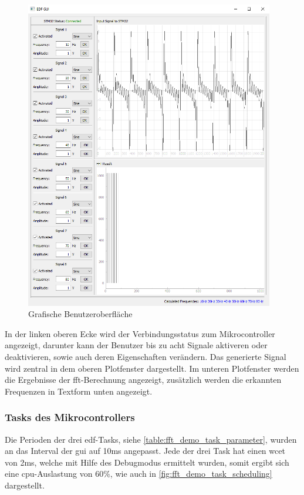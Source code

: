 \documentclass[../EDF Master Thesis.tex]{subfiles}
\begin{document}
            \begin{figure}[H]
                \centering
                \includegraphics[width=0.97\textwidth]{./attachments/gui.png}
                \caption{Grafische Benutzeroberfläche}
                \label{fig:grafische_benutzeroberflaeche}
            \end{figure}

        In der linken oberen Ecke wird der Verbindungsstatus zum Mikrocontroller angezeigt, darunter kann der Benutzer bis zu acht Signale aktiveren oder deaktivieren, sowie auch deren Eigenschaften verändern.
        Das generierte Signal wird zentral in dem oberen Plotfenster dargestellt.
        Im unteren Plotfenster werden die Ergebnisse der \ac{fft}-Berechnung angezeigt, zusätzlich werden die erkannten Frequenzen in Textform unten angezeigt.

        \subsubsection{Tasks des Mikrocontrollers}
            Die Perioden der drei \ac{edf}-Tasks, siehe \autoref{table:fft_demo_task_parameter}, wurden an das Interval der \ac{gui} auf 10ms angepasst.
            Jede der drei Task hat einen \ac{wcet} von 2ms, welche mit Hilfe des Debugmodus ermittelt wurden, somit ergibt sich eine \ac{cpu}-Auslastung von 60\%, wie auch in \autoref{fig:fft_demo_task_scheduling} dargestellt.
\end{document}
